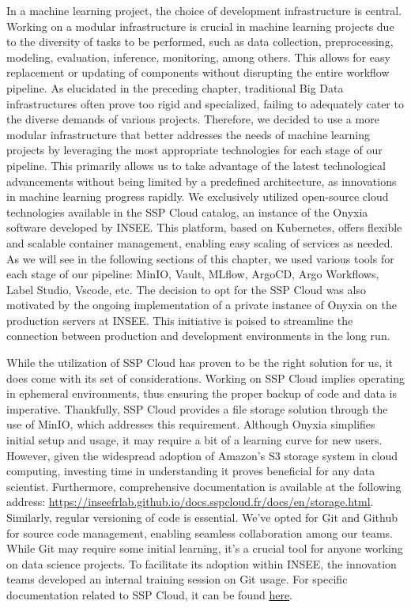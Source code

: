 In a machine learning project, the choice of development infrastructure is central. Working on a modular infrastructure is crucial in machine learning projects due to the diversity of tasks to be performed, such as data collection, preprocessing, modeling, evaluation, inference, monitoring, among others. This allows for easy replacement or updating of components without disrupting the entire workflow pipeline. As elucidated in the preceding chapter, traditional Big Data infrastructures often prove too rigid and specialized, failing to adequately cater to the diverse demands of various projects. Therefore, we decided to use a more modular infrastructure that better addresses the needs of machine learning projects by leveraging the most appropriate technologies for each stage of our pipeline. This primarily allows us to take advantage of the latest technological advancements without being limited by a predefined architecture, as innovations in machine learning progress rapidly. We exclusively utilized open-source cloud technologies available in the SSP Cloud catalog, an instance of the Onyxia software developed by INSEE. This platform, based on Kubernetes, offers flexible and scalable container management, enabling easy scaling of services as needed. As we will see in the following sections of this chapter, we used various tools for each stage of our pipeline: MinIO, Vault, MLflow, ArgoCD, Argo Workflows, Label Studio, Vscode, etc. The decision to opt for the SSP Cloud was also motivated by the ongoing implementation of a private instance of Onyxia on the production servers at INSEE. This initiative is poised to streamline the connection between production and development environments in the long run.

While the utilization of SSP Cloud has proven to be the right solution for us, it does come with its set of considerations. Working on SSP Cloud implies operating in ephemeral environments, thus ensuring the proper backup of code and data is imperative. Thankfully, SSP Cloud provides a file storage solution through the use of MinIO, which addresses this requirement. Although Onyxia simplifies initial setup and usage, it may require a bit of a learning curve for new users. However, given the widespread adoption of Amazon's S3 storage system in cloud computing, investing time in understanding it proves beneficial for any data scientist. Furthermore, comprehensive documentation is available at the following address: \url{https://inseefrlab.github.io/docs.sspcloud.fr/docs/en/storage.html}.  Similarly, regular versioning of code is essential. We've opted for Git and Github for source code management, enabling seamless collaboration among our teams. While Git may require some initial learning, it's a crucial tool for anyone working on data science projects. To facilitate its adoption within INSEE, the innovation teams developed an internal training session on Git usage. For specific documentation related to SSP Cloud, it can be found \href{https://inseefrlab.github.io/docs.sspcloud.fr/docs/en/version-control.html}{here}. 

